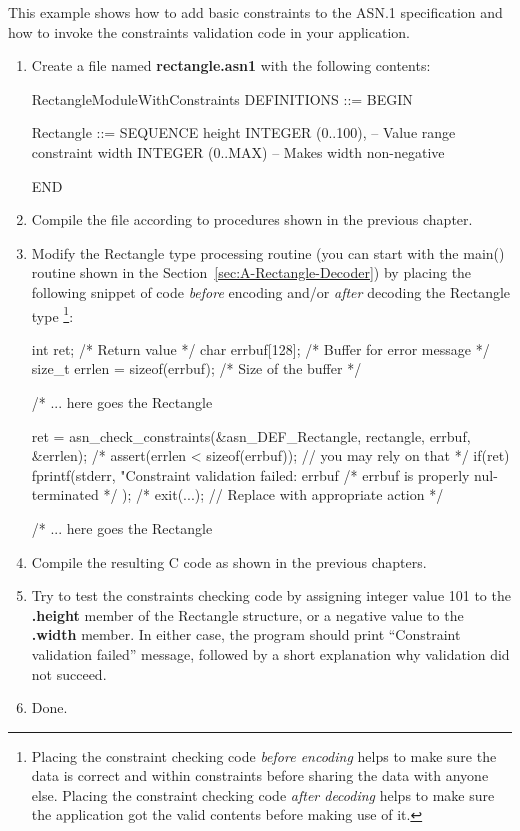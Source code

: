 \documentclass[english,oneside,12pt]{book}
\begin{document}
This example shows how to add basic constraints to the ASN.1 specification
and how to invoke the constraints validation code in your application.
\begin{enumerate}
\item Create a file named \textbf{rectangle.asn1} with the following contents:

\begin{asn}
RectangleModuleWithConstraints DEFINITIONS ::= BEGIN

Rectangle ::= SEQUENCE {
    height  INTEGER (0..100), -- Value range constraint
    width   INTEGER (0..MAX)  -- Makes width non-negative 
}

END
\end{asn}
\item Compile the file according to procedures shown in the previous chapter.
\item Modify the Rectangle type processing routine (you can start with the
main() routine shown in the Section~\ref{sec:A-Rectangle-Decoder})
by placing the following snippet of code \emph{before} encoding and/or
\emph{after} decoding the Rectangle type%
\footnote{Placing the constraint checking code \emph{before encoding} helps
to make sure the data is correct and within constraints before
sharing the data with anyone else.
Placing the constraint checking code \emph{after decoding} helps to make sure
the application got the valid contents before making use of it.%
}:

\begin{codesample}
int ret;           /* Return value */
char errbuf[128];  /* Buffer for error message */
size_t errlen = sizeof(errbuf);  /* Size of the buffer */

/* ... here goes the Rectangle %

ret = asn_check_constraints(&asn_DEF_Rectangle, rectangle, errbuf, &errlen);
/* assert(errlen < sizeof(errbuf)); // you may rely on that */
if(ret) {
    fprintf(stderr, "Constraint validation failed: %
            errbuf   /* errbuf is properly nul-terminated */
    );
    /* exit(...); // Replace with appropriate action */
 }

/* ... here goes the Rectangle %
\end{codesample}
\item Compile the resulting C code as shown in the previous chapters.
\item Try to test the constraints checking code by assigning integer value
101 to the \textbf{.height} member of the Rectangle structure, or
a negative value to the \textbf{.width} member. In either case, the
program should print ``Constraint validation failed'' message, followed
by a short explanation why validation did not succeed.
\item Done.
\end{enumerate}
\end{document}
